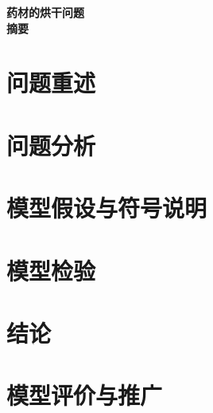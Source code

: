 \documentclass[UTF8,zihao=-4,fontset=none,a4paper]{ctexart}
\theoremstyle{definition}
\begin{document}
\setcounter{page}{1}
\begin{center}
{\LARGE\bfseries\sffamily\color{ink} 药材的烘干问题}\\[10pt]
{\large\bfseries 摘\quad 要}
\end{center}
\begingroup\small\linespread{1.08}\selectfont

\par\endgroup
\label{page:abstract-end}
\newpage

\section{问题重述}


\section{问题分析}


\section{模型假设与符号说明}




\section{模型检验}
\label{sec:validation}


\section{结论}


\section{模型评价与推广}




\begingroup
\linespread{1.05}\footnotesize
\setlength{\bibsep}{0.25em plus 0.1em}

\endgroup
\label{page:body-end}

\clearpage
\appendix
\end{document}
